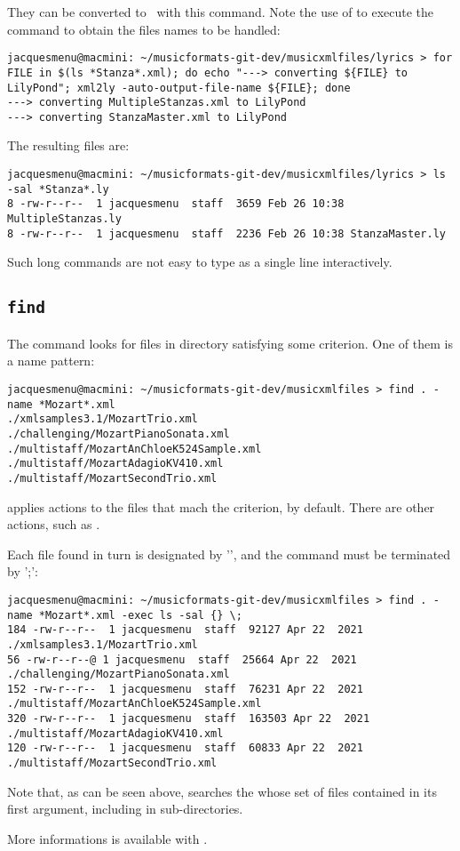 They can be converted to \lily\ with this  command. Note the use of  to execute the  command to obtain the files names to be handled:
\begin{lstlisting}[language=Terminal]
jacquesmenu@macmini: ~/musicformats-git-dev/musicxmlfiles/lyrics > for FILE in $(ls *Stanza*.xml); do echo "---> converting ${FILE} to LilyPond"; xml2ly -auto-output-file-name ${FILE}; done
---> converting MultipleStanzas.xml to LilyPond
---> converting StanzaMaster.xml to LilyPond
\end{lstlisting}

The resulting files are:
\begin{lstlisting}[language=Terminal]
jacquesmenu@macmini: ~/musicformats-git-dev/musicxmlfiles/lyrics > ls -sal *Stanza*.ly
8 -rw-r--r--  1 jacquesmenu  staff  3659 Feb 26 10:38 MultipleStanzas.ly
8 -rw-r--r--  1 jacquesmenu  staff  2236 Feb 26 10:38 StanzaMaster.ly
\end{lstlisting}

Such long  commands are not easy to type as a single line interactively.


\subsection{{\tt find}}

The  command looks for files in directory satisfying some criterion. One of them is a name pattern:
\begin{lstlisting}[language=Terminal]
jacquesmenu@macmini: ~/musicformats-git-dev/musicxmlfiles > find . -name *Mozart*.xml
./xmlsamples3.1/MozartTrio.xml
./challenging/MozartPianoSonata.xml
./multistaff/MozartAnChloeK524Sample.xml
./multistaff/MozartAdagioKV410.xml
./multistaff/MozartSecondTrio.xml
\end{lstlisting}

 applies actions to the files that mach the criterion,  by default. There are other actions, such as . 

Each file found in turn is designated by '\code{\{\}}', and the command must be terminated by '\code{\textbackslash};':
\begin{lstlisting}[language=Terminal]
jacquesmenu@macmini: ~/musicformats-git-dev/musicxmlfiles > find . -name *Mozart*.xml -exec ls -sal {} \;
184 -rw-r--r--  1 jacquesmenu  staff  92127 Apr 22  2021 ./xmlsamples3.1/MozartTrio.xml
56 -rw-r--r--@ 1 jacquesmenu  staff  25664 Apr 22  2021 ./challenging/MozartPianoSonata.xml
152 -rw-r--r--  1 jacquesmenu  staff  76231 Apr 22  2021 ./multistaff/MozartAnChloeK524Sample.xml
320 -rw-r--r--  1 jacquesmenu  staff  163503 Apr 22  2021 ./multistaff/MozartAdagioKV410.xml
120 -rw-r--r--  1 jacquesmenu  staff  60833 Apr 22  2021 ./multistaff/MozartSecondTrio.xml
\end{lstlisting}

Note that, as can be seen above,  searches the whose set of files contained in its first argument, including in sub-directories.

More informations is available with .
